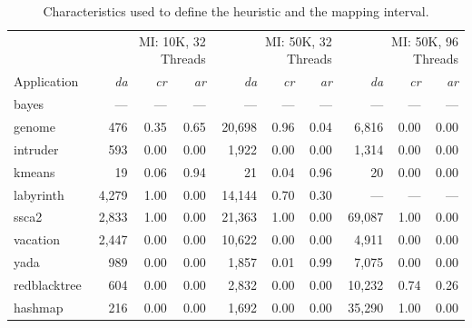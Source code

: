 \begin{table}[!tb]
	\centering
	\caption{Characteristics used to define the heuristic and the mapping interval.}
	\label{tab:characApplications}
	\small
	\begin{tabular}{@{}lrrrrrrrrr@{}}
		\toprule
		& \multicolumn{3}{r}{MI: 10K, 32 Threads} & \multicolumn{3}{r}{MI: 50K, 32 Threads} & \multicolumn{3}{r}{MI: 50K, 96 Threads} \\
		\cmidrule(lr){2-4} \cmidrule(lr){5-7} \cmidrule(l){8-10}
		Application & \textit{da}          & \textit{cr}         & \textit{ar}        & \textit{da}           & \textit{cr}        & \textit{ar}        & \textit{da}           & \textit{cr}        & \textit{ar}        \\ \midrule
		bayes        & ---           & ---          & ---         & ---            & ---         & ---         & ---            & ---         & ---         \\
		genome       & 476         & 0.35       & 0.65      & 20,698       & 0.96     & 0.04         & 6,816        & 0.00         & 0.00         \\
		intruder     & 593         & 0.00       & 0.00     & 1,922        & 0.00      & 0.00         & 1,314        & 0.00         & 0.00         \\
		kmeans       & 19          & 0.06       & 0.94     & 21           & 0.04      & 0.96      & 20           & 0.00         & 0.00         \\
		labyrinth    & 4,279       & 1.00       & 0.00     & 14,144       & 0.70      & 0.30      & ---            & ---         & ---         \\
		ssca2        & 2,833       & 1.00       & 0.00     & 21,363       & 1.00      & 0.00         & 69,087       & 1.00         & 0.00         \\
		vacation     & 2,447       & 0.00       & 0.00     & 10,622       & 0.00      & 0.00         & 4,911        & 0.00         & 0.00         \\
		yada         & 989         & 0.00       & 0.00     & 1,857        & 0.01      & 0.99      & 7,075        & 0.00         & 0.00         \\
		redblacktree & 604         & 0.00       & 0.00     & 2,832        & 0.00      & 0.00         & 10,232       & 0.74      & 0.26      \\
		hashmap      & 216         & 0.00       & 0.00     & 1,692        & 0.00      & 0.00         & 35,290       & 1.00         & 0.00         \\ \bottomrule
	\end{tabular}
\end{table}
